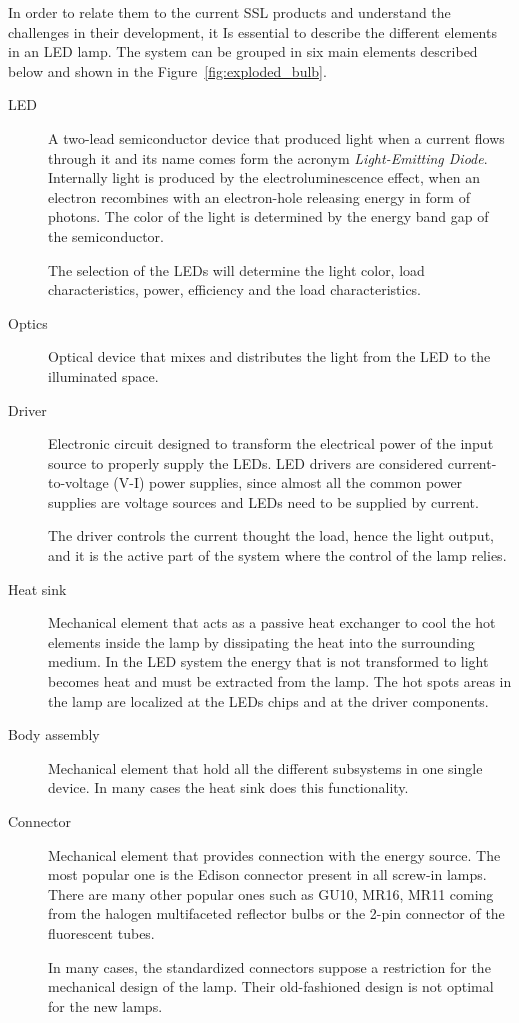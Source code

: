 In order to relate them to the current SSL products and understand the challenges in their development, it Is essential to describe the different elements in an LED lamp. The system can be grouped in six main elements described below and shown in  the Figure~\ref{fig:exploded_bulb}.

\begin{description}
  \item[LED] A two-lead semiconductor device that produced light when a current flows through it and its name comes form the acronym \emph{Light-Emitting Diode}. Internally light is produced by the electroluminescence effect, when an electron recombines with an electron-hole releasing energy in form of photons. The color of the light is determined by the energy band gap of the semiconductor.

      The selection of the LEDs will determine the light color, load characteristics, power, efficiency and the load characteristics.

  \item[Optics] Optical device that mixes and distributes the light from the LED to the illuminated space.

  \item[Driver] Electronic circuit designed to transform the electrical power of the input source to properly supply the LEDs. LED drivers are considered current-to-voltage (V-I) power supplies, since almost all the common power supplies are voltage sources and LEDs need to be supplied by current.

      The driver controls the current thought the load, hence the light output, and it is the active part of the system where the control of the lamp relies.

  \item[Heat sink] Mechanical element that acts as a passive heat exchanger to cool the hot elements inside the lamp by dissipating the heat into the surrounding medium. In the LED system the energy that is not transformed to light becomes heat and must be extracted from the lamp. The hot spots areas in the lamp are localized at the LEDs chips and at the driver components.

  \item[Body assembly] Mechanical element that hold all the different subsystems in one single device. In many cases the heat sink does this functionality.

  \item[Connector] Mechanical element that provides connection with the energy source. The most popular one is the Edison connector present in all screw-in lamps. There are many other popular ones such as GU10, MR16, MR11 coming from the halogen multifaceted reflector bulbs or the 2-pin connector of the fluorescent tubes.

      In many cases, the standardized connectors suppose a restriction for the mechanical design of the lamp. Their old-fashioned design is not optimal for the new lamps.
\end{description}

